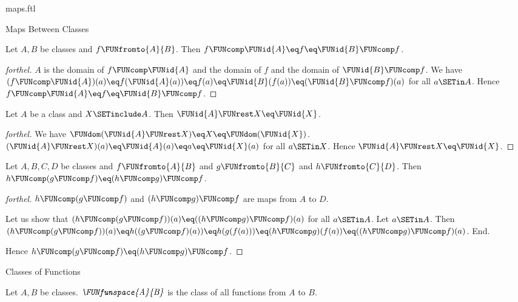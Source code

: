 \documentclass{naproche-library}
\begin{document}
\begin{smodule}[title=Maps]{maps.ftl}
\begin{sfragment}{Maps Between Classes}
  \begin{proposition}[forthel,id=FOUNDATIONS_06_3964401904254976]
    Let $A, B$ be classes and $f \FUNfromto{A}{B}$.
    Then $f \FUNcomp \FUNid{A} \eq f \eq \FUNid{B} \FUNcomp f$.
  \end{proposition}
  \begin{proof}[forthel]
    $A$ is the domain of $f \FUNcomp \FUNid{A}$ and the domain of $f$ and the domain of $\FUNid{B} \FUNcomp f$.
    We have $(f \FUNcomp \FUNid{A})(a)
      \eq f(\FUNid{A}(a))
      \eq f(a)
      \eq \FUNid{B}(f(a))
      \eq (\FUNid{B} \FUNcomp f)(a)$
    for all $a \SETin A$.
    Hence $f \FUNcomp \FUNid{A}
      \eq f
      \eq \FUNid{B} \FUNcomp f$.
  \end{proof}

  \begin{proposition}[forthel,id=FOUNDATIONS_06_3118771061391360]
    Let $A$ be a class and $X \SETinclude A$.
    Then $\FUNid{A} \FUNrest X \eq \FUNid{X}$.
  \end{proposition}
  \begin{proof}[forthel]
    We have $\FUNdom(\FUNid{A} \FUNrest X)
      \eq X
      \eq \FUNdom(\FUNid{X})$.
    $(\FUNid{A} \FUNrest X)(a)
      \eq \FUNid{A}(a)
      \eq a
      \eq \FUNid{X}(a)$
    for all $a \SETin X$.
    Hence $\FUNid{A} \FUNrest X \eq \FUNid{X}$.
  \end{proof}

  \begin{proposition}[forthel,id=FOUNDATIONS_06_6866147389472768]
    Let $A, B, C, D$ be classes and $f \FUNfromto{A}{B}$ and $g \FUNfromto{B}{C}$ and $h \FUNfromto{C}{D}$.
    Then $h \FUNcomp (g \FUNcomp f) \eq (h \FUNcomp g) \FUNcomp f$.
  \end{proposition}
  \begin{proof}[forthel]
    $h \FUNcomp (g \FUNcomp f)$ and $(h \FUNcomp g) \FUNcomp f$ are maps from $A$ to $D$.

    Let us show that $(h \FUNcomp (g \FUNcomp f))(a) \eq ((h \FUNcomp g) \FUNcomp f)(a)$ for all $a \SETin A$.
      Let $a \SETin A$.
      Then $(h \FUNcomp (g \FUNcomp f))(a)
        \eq h((g \FUNcomp f)(a))
        \eq h(g(f(a)))
        \eq (h \FUNcomp g)(f(a))
        \eq ((h \FUNcomp g) \FUNcomp f)(a)$.
    End.

    Hence $h \FUNcomp (g \FUNcomp f) \eq (h \FUNcomp g) \FUNcomp f$.
  \end{proof}
\end{sfragment}

\begin{sfragment}{Classes of Functions}
  \begin{definition}[forthel,id=FOUNDATIONS_06_5119110467813376]
    Let $A, B$ be classes.
    $\emph{\FUNfunspace{A}{B}}$ is the class of all functions from $A$ to $B$.
  \end{definition}
\end{sfragment}


\end{smodule}
\end{document}
